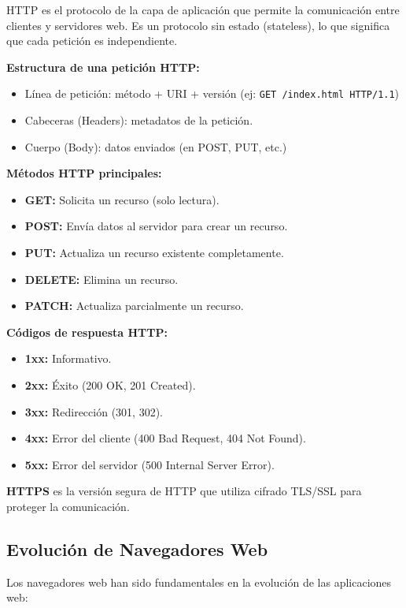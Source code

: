\documentclass[12pt,letterpaper]{article}
\begin{document}
HTTP es el protocolo de la capa de aplicaci\'on que permite la comunicaci\'on entre clientes y servidores web. Es un protocolo sin estado (stateless), lo que significa que cada petici\'on es independiente.

\textbf{Estructura de una petici\'on HTTP:}
\begin{itemize}
    \item L\'inea de petici\'on: m\'etodo + URI + versi\'on (ej: \texttt{GET /index.html HTTP/1.1})
    \item Cabeceras (Headers): metadatos de la petici\'on.
    \item Cuerpo (Body): datos enviados (en POST, PUT, etc.)
\end{itemize}

\textbf{M\'etodos HTTP principales:}
\begin{itemize}
    \item \textbf{GET:} Solicita un recurso (solo lectura).
    \item \textbf{POST:} Env\'ia datos al servidor para crear un recurso.
    \item \textbf{PUT:} Actualiza un recurso existente completamente.
    \item \textbf{DELETE:} Elimina un recurso.
    \item \textbf{PATCH:} Actualiza parcialmente un recurso.
\end{itemize}

\textbf{C\'odigos de respuesta HTTP:}
\begin{itemize}
    \item \textbf{1xx:} Informativo.
    \item \textbf{2xx:} \'Exito (200 OK, 201 Created).
    \item \textbf{3xx:} Redirecci\'on (301, 302).
    \item \textbf{4xx:} Error del cliente (400 Bad Request, 404 Not Found).
    \item \textbf{5xx:} Error del servidor (500 Internal Server Error).
\end{itemize}

\textbf{HTTPS} es la versi\'on segura de HTTP que utiliza cifrado TLS/SSL para proteger la comunicaci\'on.

\subsection{Evoluci\'on de Navegadores Web}

Los navegadores web han sido fundamentales en la evoluci\'on de las aplicaciones web:
\end{document}
